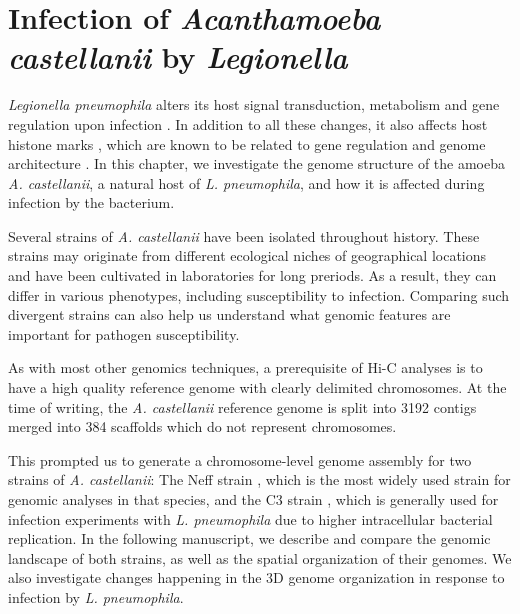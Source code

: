 
\chapter{Infection of \textit{Acanthamoeba castellanii} by \textit{Legionella}} %

\label{ch:02-02} %


\textit{Legionella pneumophila} alters its host signal transduction, metabolism and gene regulation upon infection \cite{escollTargetingHostOrganelles2016,escollLegionellaPneumophilaModulates2017}. In addition to all these changes, it also affects host histone marks \cite{rolandoLegionellaPneumophilaEffector2013}, which are known to be related to gene regulation and genome architecture \cite{bonevOrganizationFunction3D2016}. In this chapter, we investigate the genome structure of the amoeba \textit{A. castellanii}, a natural host of \textit{L. pneumophila}, and how it is affected during infection by the bacterium.

Several strains of \textit{A. castellanii} have been isolated throughout history. These strains may originate from different ecological niches of geographical locations and have been cultivated in laboratories for long preriods. As a result, they can differ in various phenotypes, including susceptibility to infection. Comparing such divergent strains can also help us understand what genomic features are important for pathogen susceptibility.

As with most other genomics techniques, a prerequisite of Hi-C analyses is to have a high quality reference genome with clearly delimited chromosomes. At the time of writing, the \textit{A. castellanii} reference genome is split into 3192 contigs merged into 384 scaffolds which do not represent chromosomes.

This prompted us to generate a chromosome-level genome assembly for two strains of \textit{A. castellanii}: The Neff strain \cite{neffPurificationAxenicCultivation1957}, which is the most widely used strain for genomic analyses in that species, and the C3 strain \cite{michelIsolationAcanthamoebaStrain1997}, which is generally used for infection experiments with \textit{L. pneumophila} due to higher intracellular bacterial replication. In the following manuscript, we describe and compare the genomic landscape of both strains, as well as the spatial organization of their genomes. We also investigate changes happening in the 3D genome organization in response to infection by \textit{L. pneumophila}.

